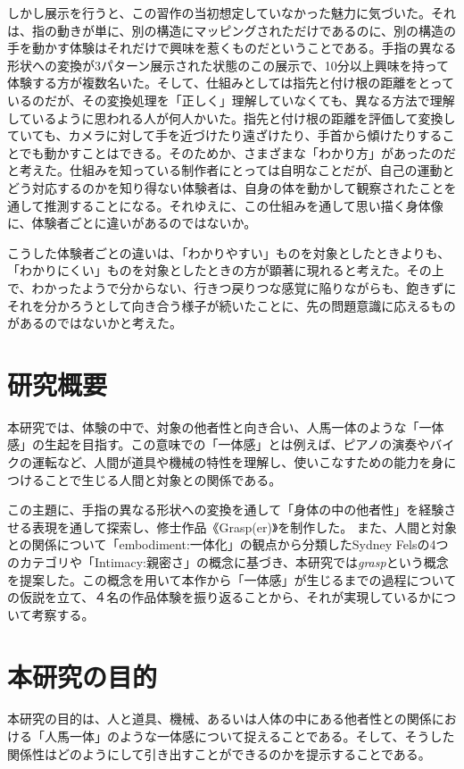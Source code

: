しかし展示を行うと、この習作の当初想定していなかった魅力に気づいた。それは、指の動きが単に、別の構造にマッピングされただけであるのに、別の構造の手を動かす体験はそれだけで興味を惹くものだということである。手指の異なる形状への変換が3パターン展示された状態のこの展示で、10分以上興味を持って体験する方が複数名いた。そして、仕組みとしては指先と付け根の距離をとっているのだが、その変換処理を「正しく」理解していなくても、異なる方法で理解しているように思われる人が何人かいた。指先と付け根の距離を評価して変換していても、カメラに対して手を近づけたり遠ざけたり、手首から傾けたりすることでも動かすことはできる。そのためか、さまざまな「わかり方」があったのだと考えた。仕組みを知っている制作者にとっては自明なことだが、自己の運動とどう対応するのかを知り得ない体験者は、自身の体を動かして観察されたことを通して推測することになる。それゆえに、この仕組みを通して思い描く身体像に、体験者ごとに違いがあるのではないか。

こうした体験者ごとの違いは、「わかりやすい」ものを対象としたときよりも、「わかりにくい」ものを対象としたときの方が顕著に現れると考えた。その上で、わかったようで分からない、行きつ戻りつな感覚に陥りながらも、飽きずにそれを分かろうとして向き合う様子が続いたことに、先の問題意識に応えるものがあるのではないかと考えた。


\section{研究概要}
本研究では、体験の中で、対象の他者性と向き合い、人馬一体のような「一体感」の生起を目指す。この意味での「一体感」とは例えば、ピアノの演奏やバイクの運転など、人間が道具や機械の特性を理解し、使いこなすための能力を身につけることで生じる人間と対象との関係である。

この主題に、手指の異なる形状への変換を通して「身体の中の他者性」を経験させる表現を通して探索し、修士作品《Grasp(er)》を制作した。
また、人間と対象との関係について「embodiment:一体化」の観点から分類したSydney Felsの4つのカテゴリや「Intimacy:親密さ」の概念に基づき、本研究では\textit{grasp}という概念を提案した。この概念を用いて本作から「一体感」が生じるまでの過程についての仮説を立て、４名の作品体験を振り返ることから、それが実現しているかについて考察する。

\section{本研究の目的}
本研究の目的は、人と道具、機械、あるいは人体の中にある他者性との関係における「人馬一体」のような一体感について捉えることである。そして、そうした関係性はどのようにして引き出すことができるのかを提示することである。

